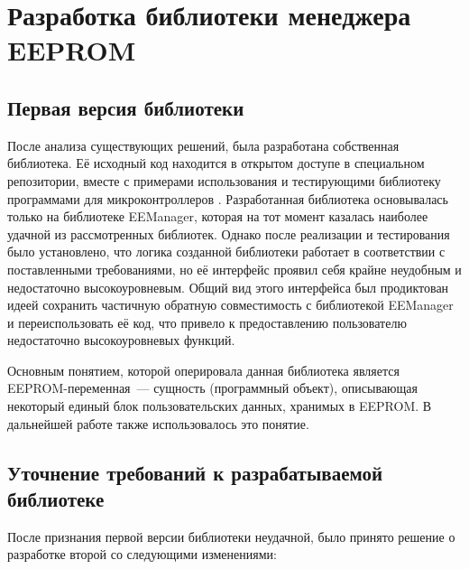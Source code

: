 \chapter{Разработка библиотеки менеджера EEPROM}

\section{Первая версия библиотеки}

После анализа существующих решений, была разработана собственная библиотека.
Её исходный код находится в открытом доступе в специальном репозитории, вместе с примерами использования и тестирующими библиотеку программами для микроконтроллеров \cite{web:my-eemanager}.
Разработанная библиотека основывалась только на библиотеке EEManager, которая на тот момент казалась наиболее удачной из рассмотренных библиотек.
Однако после реализации и тестирования было установлено, что логика созданной библиотеки работает в соответствии с поставленными требованиями, но её интерфейс проявил себя крайне неудобным и недостаточно высокоуровневым.
Общий вид этого интерфейса был продиктован идеей сохранить частичную обратную совместимость с библиотекой EEManager и переиспользовать её код, что привело к предоставлению пользователю недостаточно высокоуровневых функций.

Основным понятием, которой оперировала данная библиотека является EEPROM-переменная~--- сущность (программный объект), описывающая некоторый единый блок пользовательских данных, хранимых в EEPROM.
В дальнейшей работе также использовалось это понятие.


\section{Уточнение требований к разрабатываемой библиотеке}

После признания первой версии библиотеки неудачной, было принято решение о разработке второй со следующими изменениями:

